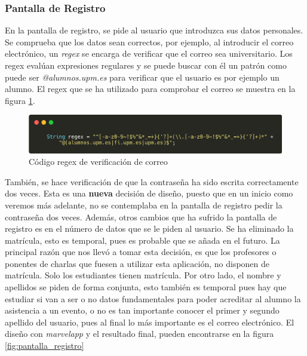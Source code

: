 \clearpage
\subsubsection{Pantalla de Registro}

En la pantalla de registro, se pide al usuario que introduzca sus datos personales. Se comprueba que los datos sean correctos, por ejemplo, al introducir el correo electrónico, un \textit{regex} se encarga de verificar que el correo sea universitario. Los regex evalúan expresiones regulares y se puede buscar con él un patrón como puede ser \textit{@alumnos.upm.es} para verificar que el usuario es por ejemplo un alumno. El regex que se ha utilizado para comprobar el correo se muestra en la figura \ref{fig:regex}. \\

\begin{figure}[h!]
  \centering
  \includegraphics[width=0.9\linewidth]{figs/Desarrollo/Codigo/regex}
  \caption[Código regex de verificación de correo]{Código regex de verificación de correo}
  \label{fig:regex}
\end{figure}

También, se hace verificación de que la contraseña ha sido escrita correctamente dos veces. Esta es una \textbf{nueva} decisión de diseño, puesto que en un inicio como veremos más adelante, no se contemplaba en la pantalla de registro pedir la contraseña dos veces. Además, otros cambios que ha sufrido la pantalla de registro es en el número de datos que se le piden al usuario. Se ha eliminado la matrícula, esto es temporal, pues es probable que se añada en el futuro. La principal razón que nos llevó a tomar esta decisión, es que los profesores o ponentes de charlas que fuesen a utilizar esta aplicación, no disponen de matrícula. Solo los estudiantes tienen matrícula. Por otro lado, el nombre y apellidos se piden de forma conjunta, esto también es temporal pues hay que estudiar si van a ser o no datos fundamentales para poder acreditar al alumno la asistencia a un evento, o no es tan importante conocer el primer y segundo apellido del usuario, pues al final lo más importante es el correo electrónico. El diseño con \emph{marvelapp} y el resultado final, pueden encontrarse en la figura \ref{fig:pantalla_registro}


